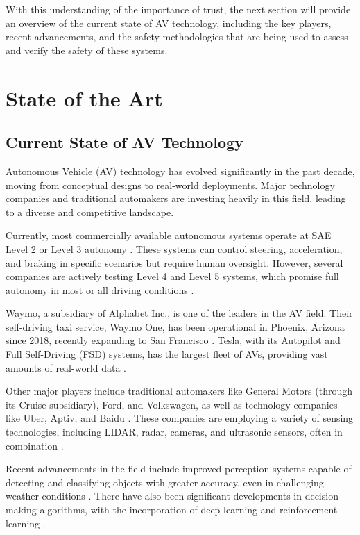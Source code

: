 With this understanding of the importance of trust, the next section will provide an overview of the current state of AV technology, including the key players, recent advancements, and the safety methodologies that are being used to assess and verify the safety of these systems.

\section{State of the Art}

\subsection{Current State of AV Technology}

Autonomous Vehicle (AV) technology has evolved significantly in the past decade, moving from conceptual designs to real-world deployments. Major technology companies and traditional automakers are investing heavily in this field, leading to a diverse and competitive landscape.

Currently, most commercially available autonomous systems operate at SAE Level 2 or Level 3 autonomy \cite{SAE2021}. These systems can control steering, acceleration, and braking in specific scenarios but require human oversight. However, several companies are actively testing Level 4 and Level 5 systems, which promise full autonomy in most or all driving conditions \cite{Yurtsever2020}.

Waymo, a subsidiary of Alphabet Inc., is one of the leaders in the AV field. Their self-driving taxi service, Waymo One, has been operational in Phoenix, Arizona since 2018, recently expanding to San Francisco \cite{Waymo2023}. Tesla, with its Autopilot and Full Self-Driving (FSD) systems, has the largest fleet of AVs, providing vast amounts of real-world data \cite{Tesla2023}.

Other major players include traditional automakers like General Motors (through its Cruise subsidiary), Ford, and Volkswagen, as well as technology companies like Uber, Aptiv, and Baidu \cite{Koopman2019}. These companies are employing a variety of sensing technologies, including LIDAR, radar, cameras, and ultrasonic sensors, often in combination \cite{Yurtsever2020}.

Recent advancements in the field include improved perception systems capable of detecting and classifying objects with greater accuracy, even in challenging weather conditions \cite{Grigorescu2020}. There have also been significant developments in decision-making algorithms, with the incorporation of deep learning and reinforcement learning \cite{Kiran2021}.

